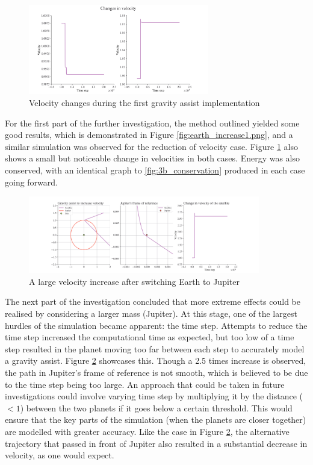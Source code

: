 \documentclass[11pt, english]{report}
\begin{document}
\begin{figure}[ht]
    \centering
    \includegraphics[width=0.7\textwidth]{graphics/earth_velocity_change1.png}
    \caption{Velocity changes during the first gravity assist implementation}
    \label{fig:earth_change1}
\end{figure}


\normalsize{\noindent For the first part of the further investigation, the method outlined yielded some good results, which is demonstrated in Figure \ref{fig:earth_increase1.png}, and a similar simulation was observed for the reduction of velocity case. Figure \ref{fig:earth_change1} also shows a small but noticeable change in velocities in both cases. Energy was also conserved, with an identical graph to \ref{fig:3b_conservation} produced in each case going forward.

\begin{figure}[ht]
    \centering
    \includegraphics[width=0.9\textwidth]{graphics/jupiter_big_increase.png}
    \caption{A large velocity increase after switching Earth to Jupiter}
    \label{fig:jupiter_big_increase}
\end{figure}

The next part of the investigation concluded that more extreme effects could be realised by considering a larger mass (Jupiter). At this stage, one of the largest hurdles of the simulation became apparent: the time step. Attempts to reduce the time step increased the computational time as expected, but too low of a time step resulted in the planet moving too far between each step to accurately model a gravity assist. Figure \ref{fig:jupiter_big_increase} showcases this. Though a 2.5 times increase is observed, the path in Jupiter's frame of reference is not smooth, which is believed to be due to the time step being too large. An approach that could be taken in future investigations could involve varying time step by multiplying it by the distance ($<1$) between the two planets if it goes below a certain threshold. This would ensure that the key parts of the simulation (when the planets are closer together) are modelled with greater accuracy. Like the case in Figure \ref{fig:jupiter_big_increase}, the alternative trajectory that passed in front of Jupiter also resulted in a substantial decrease in velocity, as one would expect.

}
\end{document}
